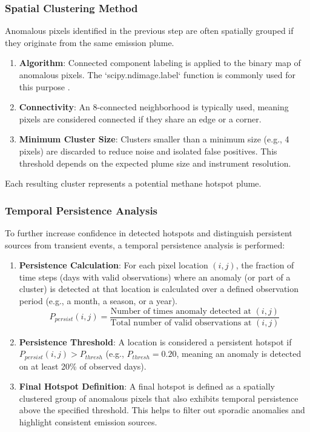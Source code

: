\documentclass[12pt,a4paper]{article}
\begin{document}
\subsubsection{Spatial Clustering Method}
Anomalous pixels identified in the previous step are often spatially grouped if they originate from the same emission plume.
\begin{enumerate}
    \item \textbf{Algorithm}: Connected component labeling is applied to the binary map of anomalous pixels. The `scipy.ndimage.label` function is commonly used for this purpose \citep{ScipyNdimage}.
    \item \textbf{Connectivity}: An 8-connected neighborhood is typically used, meaning pixels are considered connected if they share an edge or a corner.
    \item \textbf{Minimum Cluster Size}: Clusters smaller than a minimum size (e.g., 4 pixels) are discarded to reduce noise and isolated false positives. This threshold depends on the expected plume size and instrument resolution.
\end{enumerate}
Each resulting cluster represents a potential methane hotspot plume.

\subsubsection{Temporal Persistence Analysis}
To further increase confidence in detected hotspots and distinguish persistent sources from transient events, a temporal persistence analysis is performed:
\begin{enumerate}
    \item \textbf{Persistence Calculation}: For each pixel location $(i,j)$, the fraction of time steps (days with valid observations) where an anomaly (or part of a cluster) is detected at that location is calculated over a defined observation period (e.g., a month, a season, or a year).
    \begin{equation}
        P_{persist}(i,j) = \frac{\text{Number of times anomaly detected at } (i,j)}{\text{Total number of valid observations at } (i,j)}
    \end{equation}
    \item \textbf{Persistence Threshold}: A location is considered a persistent hotspot if $P_{persist}(i,j) > P_{thresh}$ (e.g., $P_{thresh} = 0.20$, meaning an anomaly is detected on at least 20\% of observed days).
    \item \textbf{Final Hotspot Definition}: A final hotspot is defined as a spatially clustered group of anomalous pixels that also exhibits temporal persistence above the specified threshold. This helps to filter out sporadic anomalies and highlight consistent emission sources.
\end{enumerate}
\end{document}
